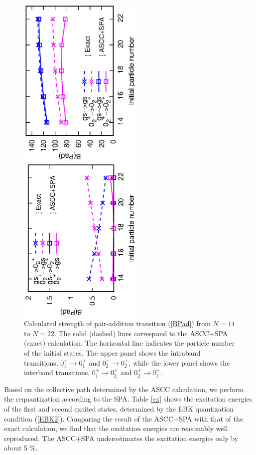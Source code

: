 \documentclass[11pt]{book} %
\begin{document}
\begin{figure}[htbp]
 \begin{center}
  \includegraphics[width=60mm,angle=-90]{images/intra_trans.eps}
 \end{center}
 \begin{center}
  \includegraphics[width=60mm,angle=-90]{images/inter_trans.eps}
 \end{center}
\caption{Calculated strength of pair-addition transition (\ref{BPad})
from $N=14$ to $N=22$. 
The solid (dashed) lines correspond to the ASCC+SPA (exact) calculation.
The horizontal line indicates the particle number of the initial states.
The upper panel shows the intraband transitions,
$0_1^+\to 0_1^+$ and $0_2^+\to 0_2^+$,
while the lower panel shows the interband transitions,
$0_1^+ \to 0_2^+$ and $0_2^+\to 0_1^+$.
}
 \label{3levelPad}
\end{figure}

Based on the collective path determined by the ASCC calculation,
we perform the requantization according to the SPA.
Table \ref{ex} shows the excitation energies of the first and second
excited states, determined by the EBK quantization condition (\ref{EBK2}).
Comparing the result of the ASCC+SPA with that of the exact calculation,
we find that the excitation energies are reasonably well reproduced. 
The ASCC+SPA underestimates the excitation energies only by about 5 \%.
\end{document}
